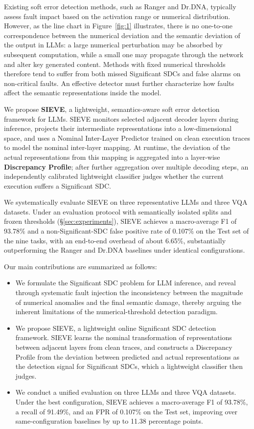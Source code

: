Existing soft error detection methods, such as Ranger and Dr.DNA, typically assess fault impact based on the activation range or numerical distribution. However, as the line chart in Figure~\ref{fig:1} illustrates, there is no one-to-one correspondence between the numerical deviation and the semantic deviation of the output in LLMs: a large numerical perturbation may be absorbed by subsequent computation, while a small one may propagate through the network and alter key generated content. Methods with fixed numerical thresholds therefore tend to suffer from both missed Significant SDCs and false alarms on non-critical faults. An effective detector must further characterize how faults affect the semantic representations inside the model.

We propose \textbf{SIEVE}, a lightweight, semantics-aware soft error detection framework for LLMs. SIEVE monitors selected adjacent decoder layers during inference, projects their intermediate representations into a low-dimensional space, and uses a Nominal Inter-Layer Predictor trained on clean execution traces to model the nominal inter-layer mapping. At runtime, the deviation of the actual representations from this mapping is aggregated into a layer-wise \textbf{Discrepancy Profile}; after further aggregation over multiple decoding steps, an independently calibrated lightweight classifier judges whether the current execution suffers a Significant SDC.

We systematically evaluate SIEVE on three representative LLMs and three VQA datasets. Under an evaluation protocol with semantically isolated splits and frozen thresholds (\S\ref{sec:experiments}), SIEVE achieves a macro-average F1 of 93.78\% and a non-Significant-SDC false positive rate of 0.107\% on the Test set of the nine tasks, with an end-to-end overhead of about 6.65\%, substantially outperforming the Ranger and Dr.DNA baselines under identical configurations.

Our main contributions are summarized as follows:
\begin{itemize}
  \item We formulate the Significant SDC problem for LLM inference, and reveal through systematic fault injection the inconsistency between the magnitude of numerical anomalies and the final semantic damage, thereby arguing the inherent limitations of the numerical-threshold detection paradigm.
  \item We propose SIEVE, a lightweight online Significant SDC detection framework. SIEVE learns the nominal transformation of representations between adjacent layers from clean traces, and constructs a Discrepancy Profile from the deviation between predicted and actual representations as the detection signal for Significant SDCs, which a lightweight classifier then judges.
  \item We conduct a unified evaluation on three LLMs and three VQA datasets. Under the best configuration, SIEVE achieves a macro-average F1 of 93.78\%, a recall of 91.49\%, and an FPR of 0.107\% on the Test set, improving over same-configuration baselines by up to 11.38 percentage points.
\end{itemize}

